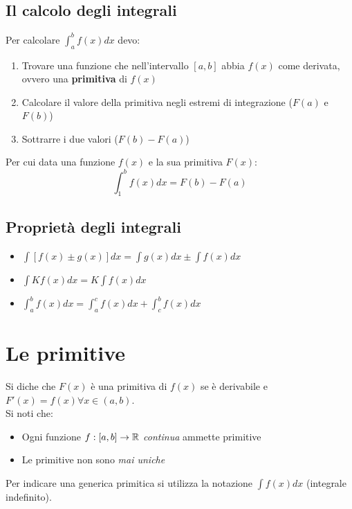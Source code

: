 \documentclass[12pt, a4paper, openany]{book}
\begin{document}
\subsection{Il calcolo degli integrali}
Per calcolare $\int_{a}^{b} f(x) dx$ devo:
\begin{enumerate}
	\item Trovare una funzione che nell'intervallo $[a,b]$ abbia $f(x)$ come derivata, ovvero una \textbf{primitiva} di $f(x)$
	\item Calcolare il valore della primitiva negli estremi di integrazione ($F(a)$ e $F(b)$)
	\item Sottrarre i due valori ($F(b)-F(a)$)
\end{enumerate}
Per cui data una funzione $f(x)$ e la sua primitiva $F(x)$: $$\int_{1}^{b} f(x)dx = F(b)- F(a)$$
\subsection{Proprietà degli integrali}
\begin{itemize}
	\item $\int[f(x) \pm g(x)] dx = \int g(x) dx \pm \int f(x) dx$
	\item $\int K f(x) dx = K\int f(x) dx$
	\item $\int_{a}^{b} f(x) dx = \int_{a}^{c} f(x) dx + \int_{c}^{b} f(x) dx$
\end{itemize}
\section{Le primitive}
Si diche che $F(x)$ è una primitiva di $f(x)$ se è derivabile e $F'(x) = f(x) \forall x\in (a,b)$.
\\Si noti che:
\begin{itemize}
	\item Ogni funzione $f:[a,b] \to \mathbb{R}$ \emph{continua} ammette primitive
	\item Le primitive non sono \emph{mai uniche}
\end{itemize}
Per indicare una generica primitica si utilizza la notazione $\int f(x) dx$ (integrale indefinito).
\end{document}
